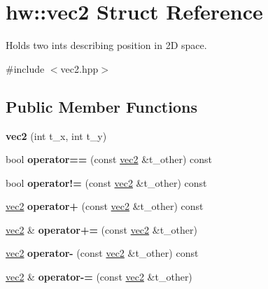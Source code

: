 \hypertarget{structhw_1_1vec2}{}\section{hw\+:\+:vec2 Struct Reference}
\label{structhw_1_1vec2}


Holds two ints describing position in 2D space.  




{\ttfamily \#include $<$vec2.\+hpp$>$}

\subsection*{Public Member Functions}
\begin{DoxyCompactItemize}
\item 
\mbox{\label{structhw_1_1vec2_a43cddeaa2d1ec8471e4669899a36433f}} 
{\bfseries vec2} (int t\+\_\+x, int t\+\_\+y)
\item 
\mbox{\label{structhw_1_1vec2_ad60f459a4d766abc03161654d13f5f03}} 
bool {\bfseries operator==} (const \mbox{\hyperlink{structhw_1_1vec2}{vec2}} \&t\+\_\+other) const
\item 
\mbox{\label{structhw_1_1vec2_abb59a5e87cc0e2754f4ce22b8bfc97a3}} 
bool {\bfseries operator!=} (const \mbox{\hyperlink{structhw_1_1vec2}{vec2}} \&t\+\_\+other) const
\item 
\mbox{\label{structhw_1_1vec2_a70a4e162eadca8198a679b2eb6861973}} 
\mbox{\hyperlink{structhw_1_1vec2}{vec2}} {\bfseries operator+} (const \mbox{\hyperlink{structhw_1_1vec2}{vec2}} \&t\+\_\+other) const
\item 
\mbox{\label{structhw_1_1vec2_a586498b69e9ac3f6c85bd525581b7e4e}} 
\mbox{\hyperlink{structhw_1_1vec2}{vec2}} \& {\bfseries operator+=} (const \mbox{\hyperlink{structhw_1_1vec2}{vec2}} \&t\+\_\+other)
\item 
\mbox{\label{structhw_1_1vec2_a874f28d6f2a34f50577569409ee8bb6c}} 
\mbox{\hyperlink{structhw_1_1vec2}{vec2}} {\bfseries operator-\/} (const \mbox{\hyperlink{structhw_1_1vec2}{vec2}} \&t\+\_\+other) const
\item 
\mbox{\label{structhw_1_1vec2_a7955bd3660904cf1198e5f43ae7acc3b}} 
\mbox{\hyperlink{structhw_1_1vec2}{vec2}} \& {\bfseries operator-\/=} (const \mbox{\hyperlink{structhw_1_1vec2}{vec2}} \&t\+\_\+other)
\end{DoxyCompactItemize}
